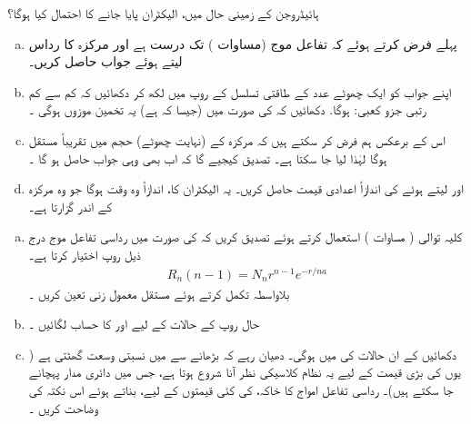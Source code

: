 ہائیڈروجن کے  زمینی حال میں، الیکٹران پایا  جانے کا احتمال کیا ہوگا؟ 
\begin{enumerate}[a.]
\item
پہلے  فرض کرتے ہوئے کہ تفاعل موج  (مساوات  )     تک درست ہے اور مرکزہ کا رداس  لیتے ہوئے  جواب حاصل کریں۔ 
\item
اپنے جواب کو ایک چھوٹے عدد  کے  طاقتی تسلسل کے روپ میں لکھ کر دکھائیں کہ کم سے کم  رتبی  جزو کعبی:     ہوگا.  دکھائیں  کہ  کی صورت میں (جیسا کہ ہے) یہ تخمین موزوں ہوگی ۔
 \item
اس کے برعکس ہم فرض کر سکتے ہیں کہ مرکزہ کے  (نہایت  چھوٹے)  حجم میں  تقریباً مستقل ہوگا لہٰذا  لیا جا سکتا ہے۔ تصدیق کیجیے گا کہ اب بھی وہی جواب حاصل  ہو گا ۔
\item
{} اور  لیتے ہوئے  کی اندازاً اعدادی قیمت حاصل کریں۔ یہ الیکٹران کا،  اندازاً وہ وقت ہوگا جو  وہ مرکزہ کے اندر گزارتا ہے۔ 
\end{enumerate}
\begin{enumerate}[a.]
\item
کلیہ توالی ( مساوات )  استعمال کرتے ہوئے تصدیق کریں کہ  کی صورت میں رداسی تفاعل موج درج ذیل روپ اختیار کرتا ہے۔ 
\begin{align*}
R_n (n - 1) = N_n r^{n - 1} e^{-r/na}
\end{align*}
بلاواسطہ تکمل کرتے ہوئے مستقل معمول زنی  تعین کریں ۔
\item
حال  روپ کے حالات کے لیے  اور  کا حساب لگائیں ۔
\item
دکھائیں کے ان حالات کی   میں    ہوگی۔ دھیان رہے کہ    بڑھانے سے  میں نسبتی   وسعت  گھٹتی ہے ( یوں  کی بڑی قیمت کے لیے یہ  نظام کلاسیکی نظر آنا شروع ہوتا ہے، جس میں دائری مدار پہچانے جا سکتے ہیں)۔ رداسی تفاعل امواج کا خاکہ،    کی کئی قیمتوں کے لیے،  بناتے ہوئے اس نکتہ  کی وضاحت کریں ۔
\end{enumerate}
\quad
